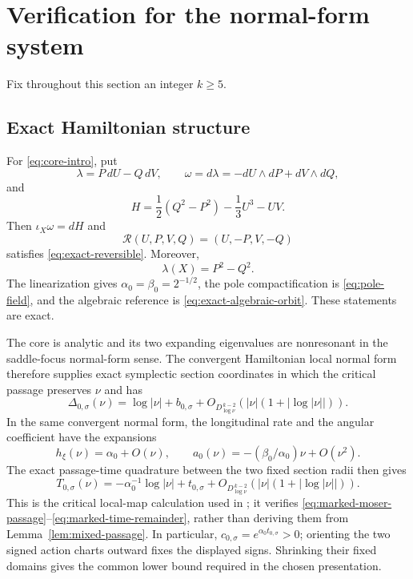 \documentclass[11pt]{amsart}
\numberwithin{equation}{section}
\theoremstyle{definition}
\theoremstyle{remark}
\newcommand{\cR}{\mathcal R}
\begin{document}
\section{Verification for the normal-form system}
\label{sec:verification}

Fix throughout this section an integer $k\ge5$.

\subsection{Exact Hamiltonian structure}

For \eqref{eq:core-intro}, put
\begin{equation}\label{eq:core-primitive}
 \lambda=P\,dU-Q\,dV,\qquad
 \omega=d\lambda=-dU\wedge dP+dV\wedge dQ,
\end{equation}
and
\begin{equation}\label{eq:core-Hamiltonian}
 H=\frac12(Q^2-P^2)-\frac13U^3-UV.
\end{equation}
Then $\iota_X\omega=dH$ and
\begin{equation}\label{eq:core-reverser}
 \cR(U,P,V,Q)=(U,-P,V,-Q)
\end{equation}
satisfies \eqref{eq:exact-reversible}.  Moreover,
\begin{equation}\label{eq:core-action-density}
 \lambda(X)=P^2-Q^2.
\end{equation}
The linearization gives
$\alpha_0=\beta_0=2^{-1/2}$, the pole compactification is
\eqref{eq:pole-field}, and the algebraic reference is
\eqref{eq:exact-algebraic-orbit}.  These statements are exact.

The core is analytic and its two expanding eigenvalues are nonresonant in
the saddle-focus normal-form sense.  The convergent Hamiltonian local
normal form therefore supplies exact symplectic section coordinates in
which the critical passage preserves $\nu$ and has
\begin{equation}\label{eq:core-moser-check}
 \Delta_{0,\sigma}(\nu)=\log|\nu|+b_{0,\sigma}
   +O_{D_{\log\nu}^{\,k-2}}
      (|\nu|(1+|\log|\nu||)).
\end{equation}
In the same convergent normal form, the longitudinal rate and the angular
coefficient have the expansions
\[
 h_\xi(\nu)=\alpha_0+O(\nu),
 \qquad a_0(\nu)=-(\beta_0/\alpha_0)\nu+O(\nu^2).
\]
The exact passage-time quadrature between the two fixed section radii then
gives
\begin{equation}\label{eq:core-time-check}
 T_{0,\sigma}(\nu)
 =-\alpha_0^{-1}\log|\nu|+t_{0,\sigma}
  +O_{D_{\log\nu}^{\,k-2}}
       (|\nu|(1+|\log|\nu||)).
\end{equation}
This is the critical local-map calculation used in
\cite{KoltsovaLerman2009Nontransverse}; it verifies
\eqref{eq:marked-moser-passage}--\eqref{eq:marked-time-remainder}, rather
than deriving them from Lemma~\ref{lem:mixed-passage}.  In particular,
$c_{0,\sigma}=e^{\alpha_0t_{0,\sigma}}>0$; orienting the two signed action
charts outward fixes the displayed signs.  Shrinking their fixed domains
gives the common lower bound required in the chosen presentation.
\end{document}
